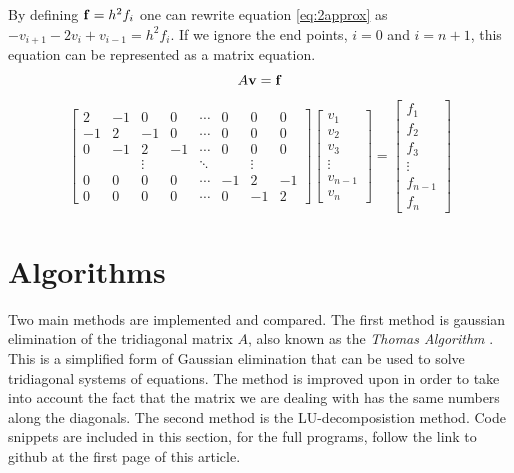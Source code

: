 \documentclass[10pt, a4paper]{amsart}
\begin{document}
By defining $\vb{f}=h^2f_i$ one can rewrite equation
\ref{eq:2approx} as $-v_{i+1}-2v_i+v_{i-1}=h^2f_i$. If we ignore the
end points, $i=0$ and $i=n+1$, this equation can be represented as a
matrix equation.
\begin{equation}
\label{eq:matrix}
A\vb{v}=\vb{f}
\end{equation}
\begin{equation}
\begin{bmatrix}
2 & -1 & 0 & 0 & \cdots & 0 & 0 & 0 \\
-1 & 2 & -1 & 0 & \cdots & 0 & 0 & 0 \\
0 & -1 & 2 & -1 & \cdots & 0 & 0 & 0 \\ 
& & \vdots &  & \ddots &  & \vdots & \\
0 & 0 & 0 & 0 & \cdots & -1 & 2 & -1 \\
0 & 0 & 0 & 0 & \cdots & 0 & -1 & 2 
\end{bmatrix}
\begin{bmatrix}
v_1 \\
v_2 \\
v_3 \\
\vdots \\
v_{n-1} \\
v_n
\end{bmatrix}=
\begin{bmatrix}
f_1 \\
f_2 \\
f_3 \\
\vdots \\
f_{n-1} \\
f_n
\end{bmatrix}
\end{equation}

\section{Algorithms}
Two main methods are implemented and compared. The first method is
gaussian elimination of the tridiagonal matrix $A$, also known as the
\emph{Thomas Algorithm} \cite{thomasalgo}. This is a simplified form of Gaussian
elimination that can be used to solve tridiagonal systems of
equations. The method is improved upon in order to take into account
the fact that the matrix we are dealing with has the same numbers
along the diagonals. The second method is the LU-decomposistion
method. Code snippets are included in this section, for the full programs, follow the link to github at the first page of this article.
\end{document}
